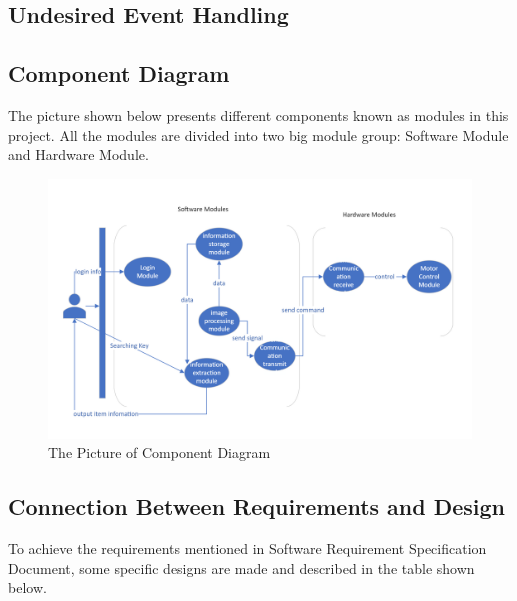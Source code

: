 \documentclass[12pt, titlepage]{article}
\begin{document}
\subsection{Undesired Event Handling}


\subsection{Component Diagram}
The picture shown below presents different components known as modules in this project. All the modules are divided into two big module group: Software Module and Hardware Module. 

\begin{figure}[H]
    \centering
    \includegraphics[scale=0.3]{Module.png}
    \caption{The Picture of Component Diagram}
\end{figure}

\subsection{Connection Between Requirements and Design} \label{SecConnection}

To achieve the requirements mentioned in Software Requirement Specification Document, some specific designs are made and described in the table shown below. 
\end{document}
